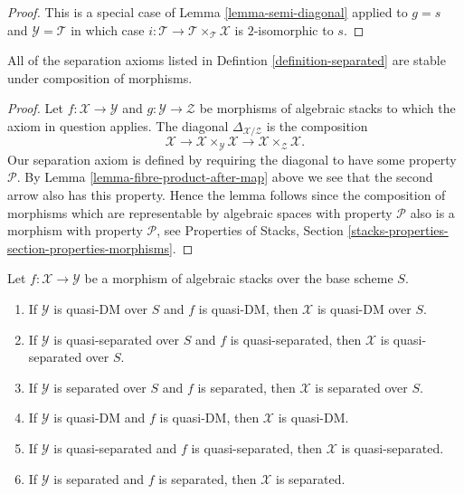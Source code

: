 \begin{proof}
This is a special case of Lemma \ref{lemma-semi-diagonal} applied to
$g = s$ and $\mathcal{Y} = \mathcal{T}$ in which case
$i : \mathcal{T} \to \mathcal{T} \times_\mathcal{T} \mathcal{X}$
is $2$-isomorphic to $s$.
\end{proof}

\begin{lemma}
\label{lemma-composition-separated}
All of the separation axioms listed in
Defintion \ref{definition-separated}
are stable under composition of morphisms.
\end{lemma}

\begin{proof}
Let $f : \mathcal{X} \to \mathcal{Y}$ and
$g : \mathcal{Y} \to \mathcal{Z}$ be morphisms of algebraic stacks
to which the axiom in question applies.
The diagonal $\Delta_{\mathcal{X}/\mathcal{Z}}$ is the composition
$$
\mathcal{X} \longrightarrow
\mathcal{X} \times_\mathcal{Y} \mathcal{X} \longrightarrow
\mathcal{X} \times_\mathcal{Z} \mathcal{X}.
$$
Our separation axiom is defined by requiring the diagonal
to have some property $\mathcal{P}$. By
Lemma \ref{lemma-fibre-product-after-map}
above we see that the second arrow also has this property.
Hence the lemma follows since the composition of
morphisms which are representable by algebraic spaces with property
$\mathcal{P}$ also is a morphism with property $\mathcal{P}$, see
Properties of Stacks,
Section \ref{stacks-properties-section-properties-morphisms}.
\end{proof}

\begin{lemma}
\label{lemma-separated-over-separated}
Let $f : \mathcal{X} \to \mathcal{Y}$ be a morphism of algebraic stacks
over the base scheme $S$.
\begin{enumerate}
\item If $\mathcal{Y}$ is quasi-DM over $S$ and $f$ is quasi-DM,
then $\mathcal{X}$ is quasi-DM over $S$.
\item If $\mathcal{Y}$ is quasi-separated over $S$ and $f$ is quasi-separated,
then $\mathcal{X}$ is quasi-separated over $S$.
\item If $\mathcal{Y}$ is separated over $S$ and $f$ is separated,
then $\mathcal{X}$ is separated over $S$.
\item If $\mathcal{Y}$ is quasi-DM and $f$ is quasi-DM,
then $\mathcal{X}$ is quasi-DM.
\item If $\mathcal{Y}$ is quasi-separated and $f$ is quasi-separated,
then $\mathcal{X}$ is quasi-separated.
\item If $\mathcal{Y}$ is separated and $f$ is separated,
then $\mathcal{X}$ is separated.
\end{enumerate}
\end{lemma}

